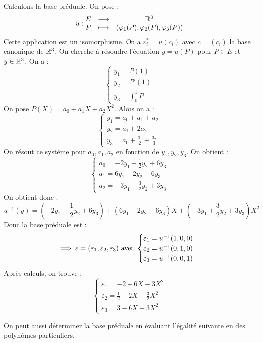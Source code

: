 \documentclass[11pt,a4paper]{report}
\begin{document}
\begin{example}
    Calculons la base préduale. On pose :
    $$u : \begin{matrix} E & \longrightarrow & \mathbb{R}^3 \\ P & \longmapsto & (\varphi_1(P), \varphi_2(P), \varphi_3(P)) \end{matrix}$$
    Cette application est un isomorphisme. On a $\varepsilon_i^* = u(c_i)$ avec $c = (c_i)$ la base canonique de $\mathbb{R}^3$. On cherche à résoudre l'équation $y = u(P)$ pour $P \in E$ et $y \in \mathbb{R}^3$. On a :
    $$\begin{cases}
        y_1 = P(1) \\
        y_2 = P'(1) \\
        y_3 = \int_0^1 P
    \end{cases}$$
    On pose $P(X) = a_0 + a_1 X + a_2 X^2$. Alors on a :
    $$\begin{cases}
        y_1 = a_0 + a_1 + a_2 \\
        y_2 = a_1 + 2a_2 \\
        y_3 = a_0 + \frac{a_1}{2} + \frac{a_2}{3}
    \end{cases}$$
    On résout ce système pour $a_0, a_1, a_2$ en fonction de $y_1, y_2, y_3$. On obtient :
    $$\begin{cases}
        a_0 = -2y_1 +\frac12 y_2 + 6y_3 \\
        a_1 = 6y_1 -2 y_2 - 6y_3 \\
        a_2 = -3y_1 + \frac32 y_2 + 3y_3
    \end{cases}$$
    On obtient donc :
    $$u^{-1}(y) = (-2y_1 +\frac12 y_2 + 6y_3) + (6y_1 -2 y_2 - 6y_3)X + (-3y_1 + \frac32 y_2 + 3y_3)X^2$$
    Donc la base préduale est :
    $$\implies \varepsilon = (\varepsilon_1, \varepsilon_2, \varepsilon_3) \text{ avec } \begin{cases} \varepsilon_1 = u^{-1}(1,0,0) \\ \varepsilon_2 = u^{-1}(0,1,0) \\ \varepsilon_3 = u^{-1}(0,0,1) \end{cases}$$
    Après calculs, on trouve :
    $$\begin{cases}
        \varepsilon_1 = -2 + 6X - 3X^2 \\
        \varepsilon_2 = \frac12 - 2X + \frac32 X^2 \\
        \varepsilon_3 = 3 - 6X + 3X^2
    \end{cases}$$

    On peut aussi déterminer la base préduale en évaluant l'égalité suivante en des polynômes particuliers.


\end{example}
\end{document}
